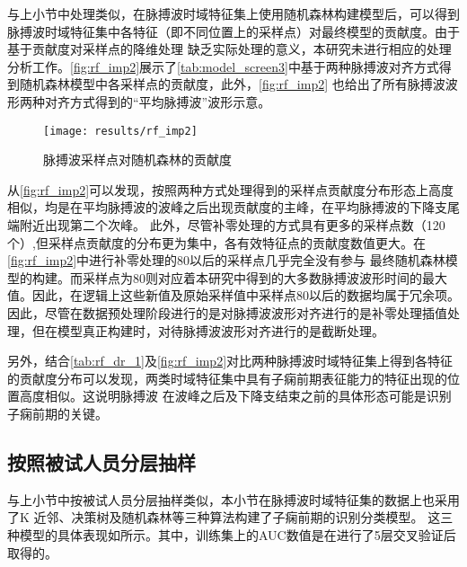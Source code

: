 与上小节中处理类似，在脉搏波时域特征集上使用随机森林构建模型后，可以得到脉搏波时域特征集中各特征（即不同位置上的采样点）对最终模型的贡献度。由于基于贡献度对采样点的降维处理
缺乏实际处理的意义，本研究未进行相应的处理分析工作。\autoref{fig:rf_imp2}展示了\autoref{tab:model_screen3}中基于两种脉搏波对齐方式得到随机森林模型中各采样点的贡献度，此外，\autoref{fig:rf_imp2}
也给出了所有脉搏波波形两种对齐方式得到的“平均脉搏波”波形示意。

\begin{figure}[htbp]
      \centering
      \texttt{[image: results/rf\_imp2]}
      \caption{\label{fig:rf_imp2}脉搏波采样点对随机森林的贡献度}
\end{figure}

从\autoref{fig:rf_imp2}可以发现，按照两种方式处理得到的采样点贡献度分布形态上高度相似，均是在平均脉搏波的波峰之后出现贡献度的主峰，在平均脉搏波的下降支尾端附近出现第二个次峰。
此外，尽管补零处理的方式具有更多的采样点数（120个）,但采样点贡献度的分布更为集中，各有效特征点的贡献度数值更大。在\autoref{fig:rf_imp2}中进行补零处理的80以后的采样点几乎完全没有参与
最终随机森林模型的构建。而采样点为80则对应着本研究中得到的大多数脉搏波波形时间的最大值。因此，在逻辑上这些新值及原始采样值中采样点80以后的数据均属于冗余项。
因此，尽管在数据预处理阶段进行的是对脉搏波波形对齐进行的是补零处理插值处理，但在模型真正构建时，对待脉搏波波形对齐进行的是截断处理。

另外，结合\autoref{tab:rf_dr_1}及\autoref{fig:rf_imp2}对比两种脉搏波时域特征集上得到各特征的贡献度分布可以发现，两类时域特征集中具有子痫前期表征能力的特征出现的位置高度相似。这说明脉搏波
在波峰之后及下降支结束之前的具体形态可能是识别子痫前期的关键。

\subsection{按照被试人员分层抽样}

与上小节中按被试人员分层抽样类似，本小节在脉搏波时域特征集的数据上也采用了K 近邻、决策树及随机森林等三种算法构建了子痫前期的识别分类模型。
这三种模型的具体表现如所示。其中，训练集上的AUC数值是在进行了5层交叉验证后取得的。

